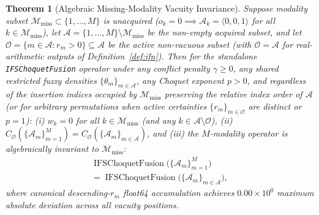 \documentclass[10pt,twocolumn]{article}
\newtheorem{theorem}{Theorem}
\begin{document}
\begin{theorem}[Algebraic Missing-Modality Vacuity Invariance]
\label{thm:degeneration}
Suppose modality subset $\mathcal{M}_{\text{miss}} \subset \{1,\dots,M\}$ is unacquired ($o_k =
0 \implies \mathcal{A}_k = \langle 0, 0, 1\rangle$ for all $k \in \mathcal{M}_{\text{miss}}$),
let $\mathcal{A} = \{1,\dots,M\} \setminus \mathcal{M}_{\text{miss}}$ be the non-empty acquired
subset, and let $\mathcal{O} = \{m \in \mathcal{A} : r_m > 0\} \subseteq \mathcal{A}$ be the
active non-vacuous subset (with $\mathcal{O} = \mathcal{A}$ for real-arithmetic outputs of
Definition~\ref{def:ifn}). Then for the standalone \texttt{IFSChoquetFusion} operator under any
conflict penalty $\gamma \ge 0$, any shared restricted fuzzy densities
$\{\theta_m\}_{m\in\mathcal{A}}$, any Choquet exponent $p > 0$, and regardless of the insertion
indices occupied by $\mathcal{M}_{\text{miss}}$ preserving the relative index order of
$\mathcal{A}$ (or for arbitrary permutations when active certainties
$\{r_m\}_{m\in\mathcal{O}}$ are distinct or $p=1$): (i) $w_k = 0$ for all $k \in
\mathcal{M}_{\text{miss}}$ (and any $k \in \mathcal{A}\setminus\mathcal{O}$), (ii)
$C_{\mathcal{O}}(\{\mathcal{A}_m\}_{m=1}^M) =
C_{\mathcal{O}}(\{\mathcal{A}_m\}_{m\in\mathcal{A}})$, and (iii) the $M$-modality operator is
algebraically invariant to $\mathcal{M}_{\text{miss}}$:
\begin{equation}
\begin{aligned}
\operatorname{IFSChoquetFusion}\big(\{\mathcal{A}_m\}_{m=1}^M\big) \\
= \operatorname{IFSChoquetFusion}\big(\{\mathcal{A}_m\}_{m\in\mathcal{A}}\big),
\end{aligned}
\end{equation}
where canonical descending-$r_m$ float64 accumulation achieves $0.00 \times 10^0$ maximum
absolute deviation across all vacuity positions.
\end{theorem}
\end{document}
